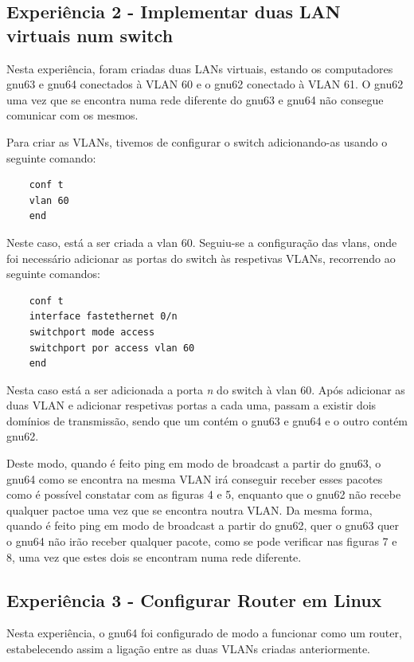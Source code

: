 \documentclass[article, a4paper, 11pt, oneside]{memoir}
\begin{document}
\subsection{Experiência 2 - Implementar duas LAN virtuais num switch}

Nesta experiência, foram criadas duas LANs virtuais, estando os computadores gnu63 e gnu64 conectados à VLAN 60 e o gnu62 conectado à VLAN 61.
O gnu62 uma vez que se encontra numa rede diferente do gnu63 e gnu64 não consegue comunicar com os mesmos.

Para criar as VLANs, tivemos de configurar o switch adicionando-as usando o seguinte comando:

\begin{lstlisting}
	conf t
	vlan 60
	end
\end{lstlisting} 
Neste caso, está a ser criada a vlan 60. 
Seguiu-se a configuração das vlans, onde foi necessário adicionar as portas do switch às respetivas VLANs, recorrendo ao seguinte comandos:

\begin{lstlisting}
	conf t
	interface fastethernet 0/n
	switchport mode access
	switchport por access vlan 60
	end
\end{lstlisting} 

Nesta caso está a ser adicionada a porta \emph{n} do switch à vlan 60. 
Após adicionar as duas VLAN e adicionar respetivas portas a cada uma, 
passam a existir dois domínios de transmissão, sendo que um contém o gnu63 e gnu64 e o outro contém gnu62.

Deste modo, quando é feito ping em modo de broadcast a partir do gnu63, o gnu64 como se encontra na mesma VLAN irá conseguir 
receber esses pacotes como é possível constatar com as figuras 4 e 5, enquanto que o gnu62 não recebe qualquer pactoe uma vez que se encontra noutra VLAN.
Da mesma forma, quando é feito ping em modo de broadcast a partir do gnu62, quer o gnu63 quer o gnu64 não irão receber qualquer pacote, como se pode verificar
nas figuras 7 e 8, uma vez que estes dois se encontram numa rede diferente.


\subsection{Experiência 3 - Configurar Router em Linux}

Nesta experiência, o gnu64 foi configurado de modo a funcionar como um router, estabelecendo assim a ligação entre as duas VLANs criadas anteriormente.
\end{document}
